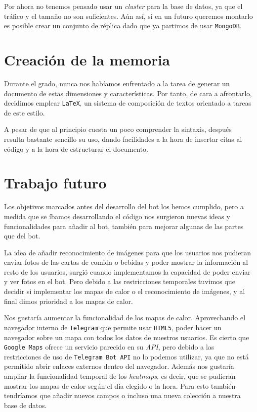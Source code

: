 \documentclass[oneside]{memoir}
\begin{document}
Por ahora no tenemos pensado usar un \textit{cluster} para la base de datos, ya que el tráfico y el tamaño no son suficientes. Aún así, si en un futuro queremos montarlo es posible crear un conjunto de réplica dado que ya partimos de usar \texttt{MongoDB}.

\section{Creación de la memoria}
Durante el grado, nunca nos habíamos enfrentado a la tarea de generar un documento de estas dimensiones y características. Por tanto, de cara a afrontarlo, decidimos emplear \texttt{LaTeX}, un sistema de composición de textos orientado a tareas de este estilo. 

A pesar de que al principio cuesta un poco comprender la sintaxis, después resulta bastante sencillo su uso, dando facilidades a la hora de insertar citas al código y a la hora de estructurar el documento.

\section{Trabajo futuro}
Los objetivos marcados antes del desarrollo del bot los hemos cumplido, pero a medida que se íbamos desarrollando el código nos surgieron nuevas ideas y funcionalidades para añadir al bot, también para mejorar algunas de las partes que del bot.

La idea de añadir reconocimiento de imágenes para que los usuarios nos pudieran enviar fotos de las cartas de comida o bebidas y poder mostrar la información al resto de los usuarios, surgió cuando implementamos la capacidad de poder enviar y ver fotos en el bot. Pero debido a las restricciones temporales tuvimos que decidir si implementar los mapas de calor o el reconocimiento de imágenes, y al final dimos prioridad a los mapas de calor.

Nos gustaría aumentar la funcionalidad de los mapas de calor. Aprovechando el navegador interno de \texttt{Telegram} que permite usar \texttt{HTML5}, poder hacer un navegador sobre un mapa con todos los datos de nuestros usuarios. Es cierto que \texttt{Google Maps} ofrece un servicio parecido en su \textit{API}, pero debido a las restricciones de uso de \texttt{Telegram Bot API} no lo podemos utilizar, ya que no está permitido abrir enlaces externos dentro del navegador. Además nos gustaría ampliar la funcionalidad temporal de los \textit{heatmaps}, es decir, que se pudieran mostrar los mapas de calor según el día elegido o la hora. Para esto también tendríamos que añadir nuevos campos o incluso una nueva colección a nuestra base de datos.
\end{document}
